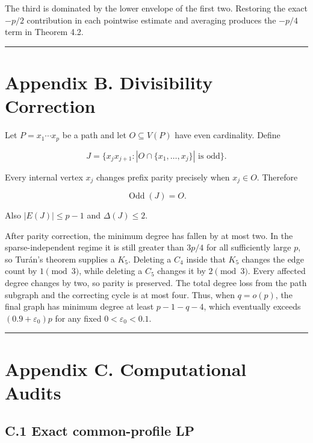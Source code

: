 \documentclass[
  11pt,
]{article}
\begin{document}
The third is dominated by the lower envelope of the first two. Restoring
the exact \(-p/2\) contribution in each pointwise estimate and averaging
produces the \(-p/4\) term in Theorem 4.2.

\begin{center}\rule{0.5\linewidth}{0.5pt}\end{center}

\section{Appendix B. Divisibility
Correction}\label{appendix-b.-divisibility-correction}

Let \(P=x_1\cdots x_p\) be a path and let \(O\subseteq V(P)\) have even
cardinality. Define

\[
J=\{x_jx_{j+1}:|O\cap\{x_1,\ldots,x_j\}|\text{ is odd}\}.
\]

Every internal vertex \(x_j\) changes prefix parity precisely when
\(x_j\in O\). Therefore

\[
\operatorname{Odd}(J)=O.
\]

Also \(|E(J)|\le p-1\) and \(\Delta(J)\le2\).

After parity correction, the minimum degree has fallen by at most two.
In the sparse-independent regime it is still greater than \(3p/4\) for
all sufficiently large \(p\), so Turán's theorem supplies a \(K_5\).
Deleting a \(C_4\) inside that \(K_5\) changes the edge count by
\(1\pmod3\), while deleting a \(C_5\) changes it by \(2\pmod3\). Every
affected degree changes by two, so parity is preserved. The total degree
loss from the path subgraph and the correcting cycle is at most four.
Thus, when \(q=o(p)\), the final graph has minimum degree at least
\(p-1-q-4\), which eventually exceeds \((0.9+\varepsilon_0)p\) for any
fixed \(0<\varepsilon_0<0.1\).

\begin{center}\rule{0.5\linewidth}{0.5pt}\end{center}

\section{Appendix C. Computational
Audits}\label{appendix-c.-computational-audits}

\subsection{C.1 Exact common-profile
LP}\label{c.1-exact-common-profile-lp}
\end{document}
